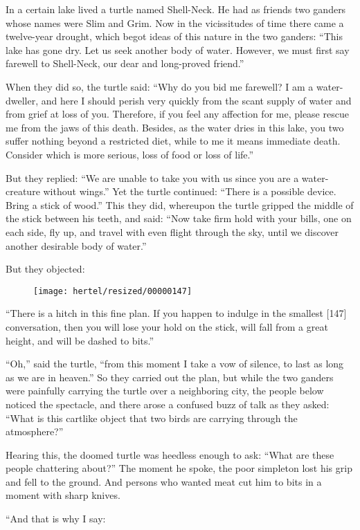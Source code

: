 \documentclass[article, twoside, 10pt]{memoir}
\begin{document}
In a certain lake lived a turtle named Shell-Neck. He had as
friends two ganders whose names were Slim and Grim. Now in the
vicissitudes of time there came a twelve-year drought, which begot
ideas of this nature in the two ganders:
``This lake has gone dry. Let us seek another body of water. However, we must first say farewell to Shell-Neck, our dear and long-proved friend.''

When they did so, the turtle said:
``Why do you bid me farewell? I am a water-dweller, and here I should perish very quickly from the scant supply of water and from grief at loss of you. Therefore, if you feel any affection for me, please rescue me from the jaws of this death. Besides, as the water dries in this lake, you two suffer nothing beyond a restricted diet, while to me it means immediate death. Consider which is more serious, loss of food or loss of life.''

But they replied:
``We are unable to take you with us since you are a water-creature without wings.''
Yet the turtle continued:
``There is a possible device. Bring a stick of wood.'' This they
did, whereupon the turtle gripped the middle of the stick between
his teeth, and said:
``Now take firm hold with your bills, one on each side, fly up, and travel with even flight through the sky, until we discover another desirable body of water.''

But they objected:
\begin{figure}[p]\texttt{[image: hertel/resized/00000147]}\end{figure}``There is a hitch in this fine plan. If you happen to indulge in the smallest [147] conversation, then you will lose your hold on the stick, will fall from a great height, and will be dashed to bits.''

``Oh,'' said the turtle,
``from this moment I take a vow of silence, to last as long as we are in heaven.''
So they carried out the plan, but while the two ganders were
painfully carrying the turtle over a neighboring city, the people
below noticed the spectacle, and there arose a confused buzz of
talk as they asked:
``What is this cartlike object that two birds are carrying through the atmosphere?''

Hearing this, the doomed turtle was heedless enough to ask:
``What are these people chattering about?'' The moment he spoke,
the poor simpleton lost his grip and fell to the ground. And
persons who wanted meat cut him to bits in a moment with sharp
knives.

“And that is why I say:
\end{document}
